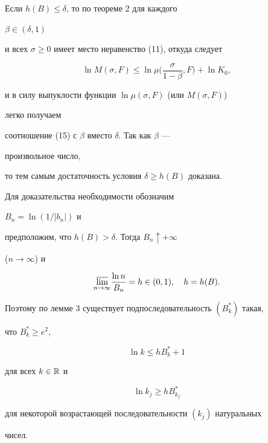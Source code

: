  


\begin{pf} Если $h(B)\le\delta$, то по теореме 2 для каждого 


$\beta\in(\delta,1)$ 


и всех $\sigma\ge 0$ имеет место неравенство (11), откуда следует


$$ 


\ln M(\sigma,F)\le\ln\mu 


\biggl(\frac{\sigma}{1-\beta},F \biggr)+\ln K_0, 


$$ 


и в силу выпуклости функции $\ln\mu(\sigma,F)$ (или $M(\sigma,F)$) 


легко получаем 


соотношение (15) с $\beta$ вместо $\delta$. Так как $\beta$ --- 


произвольное число, 


то тем самым достаточность условия $\delta\ge h(B)$ доказана. 


 


Для доказательства необходимости обозначим 


$B_n=\ln(1/|b_n|)$ и 


предположим, что $h(B)>\delta$. Тогда $B_n\uparrow+\infty$ 


($n\to\infty$) и 


$$ 


\underset{n\to\infty}{\varlimsup}\frac{\ln n}{B_n} 


=h\in(0,1),\quad h=h(B). 


$$ 


Поэтому по лемме 3 существует подпоследовательность $(B^*_k)$ такая, 


что $B^*_k\ge e^2$, 


\begin{equation} 


\ln k\le h B^*_k+1 


\end{equation} 


для всех $k\in \Bbb R$ и 


\begin{equation} 


\ln k_j\ge h B^*_{k_j} 


\end{equation} 


для некоторой возрастающей последовательности $(k_j)$ натуральных 


чисел. 



\end{pf}
